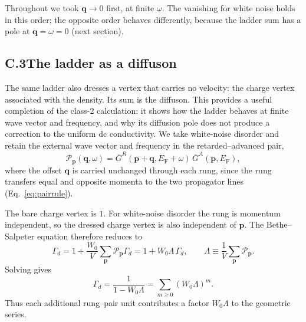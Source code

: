 Throughout we took $\mathbf q\to0$ first, at finite $\omega$. The
vanishing for white noise holds in this order; the opposite order
behaves differently, because the ladder sum has a pole at
$\mathbf q=\omega=0$ (next section).
\subsection*{C.3\quad The ladder as a diffuson}

The same ladder also dresses a vertex that carries no velocity: the
charge vertex associated with the density. Its sum is the diffuson.
This provides a useful completion of the class-2 calculation: it
shows how the ladder behaves at finite wave vector and frequency, and
why its diffusion pole does not produce a correction to the uniform
dc conductivity. We take white-noise disorder and retain the external
wave vector and frequency in the retarded--advanced pair,
\[
\mathcal P_{\mathbf p}(\mathbf q,\omega)
=\overline G^R(\mathbf p+\mathbf q,E_{\mathrm F}+\omega)\,
 \overline G^A(\mathbf p,E_{\mathrm F}),
\]
where the offset $\mathbf q$ is carried unchanged through each rung,
since the rung transfers equal and opposite momenta to the two
propagator lines (Eq.~\eqref{eq:pairrule}).

The bare charge vertex is $1$. For white-noise disorder the rung is
momentum independent, so the dressed charge vertex is also independent
of $\mathbf p$. The Bethe--Salpeter equation therefore reduces to
\[
\Gamma_d
=1+\frac{W_0}{V}\sum_{\mathbf p}
  \mathcal P_{\mathbf p}\Gamma_d
=1+W_0\Lambda\,\Gamma_d,
\qquad
\Lambda\equiv\frac1V\sum_{\mathbf p}\mathcal P_{\mathbf p}.
\]
Solving gives
\[
\Gamma_d=\frac{1}{1-W_0\Lambda}
=\sum_{m\ge0}(W_0\Lambda)^m.
\]
Thus each additional rung--pair unit contributes a factor
$W_0\Lambda$ to the geometric series.


